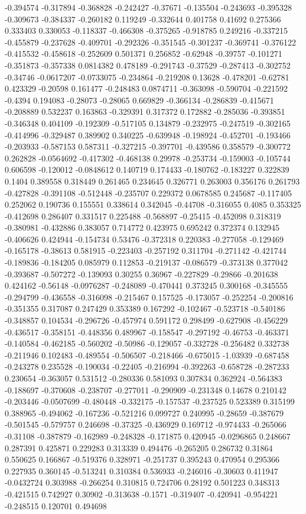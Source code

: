 -0.394574 -0.317894 -0.368828 -0.242427 -0.37671 -0.135504 -0.243693 -0.395328 -0.309673 -0.384337 -0.260182 0.119249 -0.332644 0.401758 0.41692 0.275366 0.333403 0.330053 -0.118337 -0.466308 -0.375265 -0.918785 0.249216 -0.337215 -0.455879 -0.237628 -0.409701 -0.292326 -0.351545 -0.301237 -0.369741 -0.376122 -0.415532 -0.458618 -0.252609 0.501371 0.256852 -0.62948 -0.39757 -0.101271 -0.351873 -0.357338 0.0814382 0.478189 -0.291743 -0.37529 -0.287413 -0.302752 -0.34746 -0.0617207 -0.0733075 -0.234864 -0.219208 0.13628 -0.478201 -0.62781 0.423329 -0.20598 0.161477 -0.248483 0.0874711 -0.363098 -0.590704 -0.221592 -0.4394 0.194083 -0.28073 -0.28065 0.669829 -0.366134 -0.286839 -0.415671 -0.208889 0.532237 0.163863 -0.329391 0.317372 0.172882 -0.285036 -0.393851 -0.346348 0.404109 -0.192309 -0.517105 0.134879 -0.232975 -0.247519 -0.302165 -0.414996 -0.329487 0.389902 0.340225 -0.639948 -0.198924 -0.452701 -0.193466 -0.203933 -0.587153 0.587311 -0.327215 -0.397701 -0.439586 0.358579 -0.300772 0.262828 -0.0564692 -0.417302 -0.468138 0.29978 -0.253734 -0.159003 -0.105744 0.606598 -0.120012 -0.0848612 0.140719 0.174433 -0.180762 -0.183227 0.322839 0.1404 0.389558 0.318449 0.261465 0.234645 0.326771 0.263003 0.356176 0.261793 -0.427828 -0.391108 -0.512448 -0.235707 0.229372 0.0678585 0.245687 -0.117405 0.252062 0.190736 0.155551 0.338614 0.342045 -0.44708 -0.316055 0.4085 0.353325 -0.412698 0.286407 0.331517 0.225488 -0.568897 -0.25415 -0.452098 0.318319 -0.380981 -0.432886 0.383057 0.714772 0.423975 0.695242 0.372374 0.132945 -0.406626 0.424944 -0.154734 0.53476 -0.372318 0.220383 -0.277058 -0.129469 -0.165178 -0.38613 0.581915 -0.223403 -0.257192 0.311704 -0.271142 -0.421744 -0.189836 -0.184205 0.085979 0.112853 -0.219137 -0.086579 -0.373138 0.377042 -0.393687 -0.507272 -0.139093 0.30255 0.36967 -0.227829 -0.29866 -0.201638 0.424162 -0.56148 -0.0976287 -0.248089 -0.470441 0.373245 0.300168 -0.345555 -0.294799 -0.436558 -0.316098 -0.215467 0.157525 -0.173057 -0.252254 -0.200816 -0.351355 0.317087 0.247429 0.353389 0.167292 -0.102467 -0.523718 -0.540186 -0.348857 0.104534 -0.296726 -0.457974 0.591172 0.298499 -0.627908 -0.456229 -0.436517 -0.358151 -0.448356 0.489967 -0.158547 -0.297192 -0.46753 -0.463371 -0.140584 -0.462185 -0.560202 -0.50986 -0.129057 -0.332728 -0.256482 0.332738 -0.211946 0.102483 -0.489554 -0.506507 -0.218466 -0.675015 -1.03939 -0.687458 -0.243278 0.235528 -0.190034 -0.22405 -0.216994 -0.392263 -0.658728 -0.287233 0.230654 -0.363057 0.531512 -0.280336 0.581093 0.307834 0.362924 -0.564383 -0.188697 -0.370608 -0.238707 -0.277011 -0.290909 -0.231348 0.14678 0.210142 -0.203446 -0.0507699 -0.480448 -0.332175 -0.157537 -0.237525 0.523389 0.315199 0.388965 -0.494062 -0.167236 -0.521216 0.099727 0.240995 -0.28659 -0.387679 -0.501545 -0.579757 0.246698 -0.37325 -0.436929 0.169712 -0.974433 -0.265066 -0.31108 -0.387879 -0.162989 -0.248328 -0.171875 0.420945 -0.0296865 0.248667 0.287391 0.425871 0.229283 0.313339 0.494476 -0.265205 0.286732 0.31864 0.550625 0.166867 -0.519376 0.328971 -0.251737 0.395243 0.470954 0.295366 0.227935 0.360145 -0.513241 0.310384 0.536933 -0.246016 -0.30603 0.411947 -0.0432724 0.303988 -0.266254 0.310815 0.724706 0.28192 0.501223 0.348313 -0.421515 0.742927 0.30902 -0.313638 -0.1571 -0.319407 -0.420941 -0.954221 -0.248515 0.120701 0.494698 
